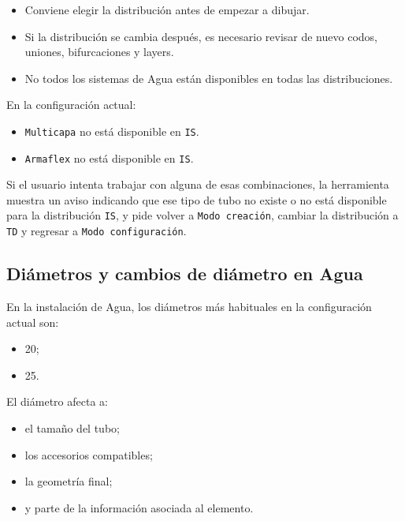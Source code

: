 \begin{itemize}
\item Conviene elegir la distribución antes de empezar a dibujar.
\item Si la distribución se cambia después, es necesario revisar de nuevo codos, uniones, bifurcaciones y layers.
\item No todos los sistemas de Agua están disponibles en todas las distribuciones.
\end{itemize}

En la configuración actual:

\begin{itemize}
\item \texttt{Multicapa} no está disponible en \texttt{IS}.
\item \texttt{Armaflex} no está disponible en \texttt{IS}.
\end{itemize}

Si el usuario intenta trabajar con alguna de esas combinaciones, la herramienta muestra un aviso indicando que ese tipo de tubo no existe o no está disponible para la distribución \texttt{IS}, y pide volver a \texttt{Modo creación}, cambiar la distribución a \texttt{TD} y regresar a \texttt{Modo configuración}.



\subsection{Diámetros y cambios de diámetro en Agua}

En la instalación de Agua, los diámetros más habituales en la configuración actual son:

\begin{itemize}
\item 20;
\item 25.
\end{itemize}

El diámetro afecta a:

\begin{itemize}
\item el tamaño del tubo;
\item los accesorios compatibles;
\item la geometría final;
\item y parte de la información asociada al elemento.
\end{itemize}


